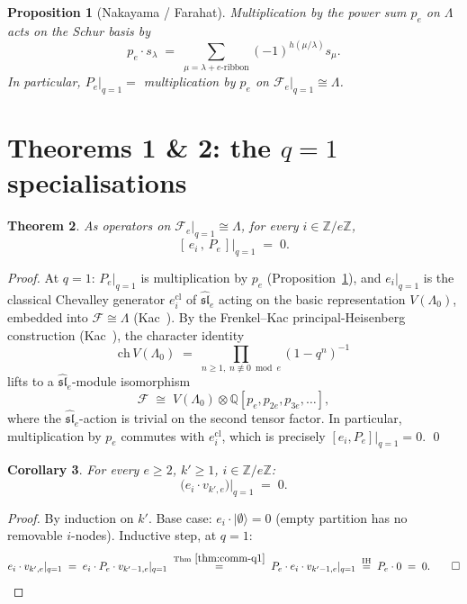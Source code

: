 \documentclass[11pt]{article}
\newtheorem{theorem}{Theorem}
\newtheorem{proposition}[theorem]{Proposition}
\newtheorem{corollary}[theorem]{Corollary}
\theoremstyle{definition}
\newcommand{\Fock}{\mathcal{F}}
\newcommand{\slh}{\widehat{\mathfrak{sl}}}
\newcommand{\Lam}{\Lambda_0}
\newcommand{\vke}{v_{k',e}}
\begin{document}
\begin{proposition}[Nakayama / Farahat] \label{prop:farahat}
Multiplication by the power sum $p_e$ on $\Lambda$ acts on the Schur basis by
\[
    p_e \cdot s_\lambda \;=\; \sum_{\mu = \lambda + e\text{-ribbon}} (-1)^{h(\mu/\lambda)} s_\mu.
\]
In particular, $P_e|_{q=1} = $ multiplication by $p_e$ on $\Fock_e|_{q=1} \cong \Lambda$.
\end{proposition}

\section{Theorems 1 \& 2: the $q=1$ specialisations}

\begin{theorem} \label{thm:comm-q1}
    As operators on $\Fock_e|_{q=1} \cong \Lambda$, for every $i \in \mathbb{Z}/e\mathbb{Z}$,
    \[
        [\, e_i \,,\, P_e \,] \Big|_{q=1} \;=\; 0.
    \]
\end{theorem}

\begin{proof}
At $q=1$: $P_e|_{q=1}$ is multiplication by $p_e$ (Proposition~\ref{prop:farahat}),
and $e_i|_{q=1}$ is the classical Chevalley generator $e_i^{\mathrm{cl}}$ of
$\slh_e$ acting on the basic representation $V(\Lam)$, embedded into
$\Fock \cong \Lambda$ (Kac~\cite[\S12, \S14]{Kac}). By the Frenkel--Kac principal-Heisenberg
construction (Kac~\cite[Cor.\ 14.10; (14.10.9)]{Kac}), the character identity
\begin{equation}
    \mathrm{ch}\, V(\Lam) \;=\; \prod_{n \ge 1,\; n \not\equiv 0 \bmod e} (1 - q^n)^{-1}
\end{equation}
lifts to a $\slh_e$-module isomorphism
\begin{equation} \label{eq:FKtensor}
    \Fock \;\cong\; V(\Lam) \otimes \mathbb{Q}[p_e, p_{2e}, p_{3e}, \ldots],
\end{equation}
where the $\slh_e$-action is trivial on the second tensor factor. In particular,
multiplication by $p_e$ commutes with $e_i^{\mathrm{cl}}$, which is precisely
$[e_i, P_e]|_{q=1} = 0$. \qed
\end{proof}

\begin{corollary} \label{cor:chev-q1}
    For every $e \ge 2$, $k' \ge 1$, $i \in \mathbb{Z}/e\mathbb{Z}$:
    \[
        \bigl( e_i \cdot \vke \bigr) \Big|_{q=1} \;=\; 0.
    \]
\end{corollary}

\begin{proof}
By induction on $k'$. Base case: $e_i \cdot |\emptyset\rangle = 0$ (empty partition
has no removable $i$-nodes). Inductive step, at $q=1$:
\begin{equation}
    e_i \cdot v_{k',e}|_{q=1} \;=\; e_i \cdot P_e \cdot v_{k'-1,e}|_{q=1}
    \;\stackrel{\text{Thm}\ \ref{thm:comm-q1}}{=}\; P_e \cdot e_i \cdot v_{k'-1,e}|_{q=1}
    \;\stackrel{\text{IH}}{=}\; P_e \cdot 0 \;=\; 0. \qed
\end{equation}
\end{proof}
\end{document}
